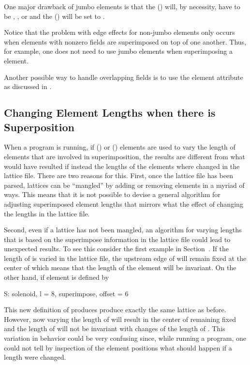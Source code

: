 One major drawback of jumbo  elements is that the 
() will, by necessity, have to be , , or
 and the  () will be set to .

Notice that the problem with edge effects for non-jumbo
 elements only occurs when elements with nonzero
fields are superimposed on top of one another. Thus, for example, one
does not need to use jumbo elements when superimposing a 
element.

Another possible way to handle overlapping fields is to use the 
element attribute as discussed in .

\subsection{Changing Element Lengths when there is Superposition}
\label{s:super.length}

When a program is running, if  () or
 () elements are used to vary the length
of elements that are involved in superimposition, the results are
different from what would have resulted if instead the lengths of the
elements where changed in the lattice file. There are two reasons for
this. First, once the lattice file has been parsed, lattices can be
``mangled'' by adding or removing elements in a myriad of ways. This
means that it is not possible to devise a general algorithm for
adjusting superimposed element lengths that mirrors what the effect of
changing the lengths in the lattice file.

Second, even if a lattice has not been mangled, an algorithm for
varying lengths that is based on the superimpose information in the
lattice file could lead to unexpected results. To see this consider
the first example in Section~. If the length of 
is varied in the lattice file, the upstream edge of  will remain
fixed at the center of  which means that the length of the
 element  will be invariant. On the other
hand, if element  is defined by 
\begin{example}
  S: solenoid, l = 8, superimpose, offset = 6
\end{example}
This new definition of  produces produce exactly the same
lattice as before. However, now varying the length of  will
result in the center of  remaining fixed and the length of
 will not be invariant with changes of the length of
. This variation in behavior could be very confusing since,
while running a program, one could not tell by inspection of the
element positions what should happen if a length were changed.

